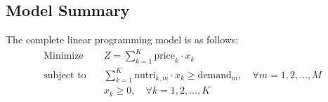 \documentclass{article}
\begin{document}
\subsection*{Model Summary}
The complete linear programming model is as follows:
\begin{align*}
\text{Minimize} & \quad Z = \sum_{k=1}^{K} \text{price}_k \cdot x_k \\
\text{subject to} & \quad \sum_{k=1}^{K} \text{nutri}_{k,m} \cdot x_k \geq \text{demand}_m, \quad \forall m = 1, 2, \ldots, M \\
& \quad x_k \geq 0, \quad \forall k = 1, 2, \ldots, K
\end{align*}
\end{document}
